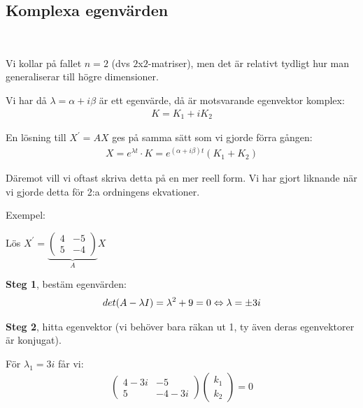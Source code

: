 \subsection{Komplexa egenvärden}\hfill\\
\par\bigskip
\noindent Vi kollar på fallet $n=2$ (dvs $2$x$2$-matriser), men det är relativt tydligt hur man generaliserar till högre dimensioner.\par
\noindent Vi har då $\lambda = \alpha+i\beta$ är ett egenvärde, då är motsvarande egenvektor komplex:
\begin{equation*}
  \begin{gathered}
    K = K_1+iK_2
  \end{gathered}
\end{equation*}\par
\noindent En lösning till $X^{\prime} = AX$ ges på samma sätt som vi gjorde förra gången:
\begin{equation*}
  \begin{gathered}
    X = e^{\lambda t}\cdot K = e^{(\alpha+i\beta)t}\left(K_1+K_2\right)
  \end{gathered}
\end{equation*}\par
\noindent Däremot vill vi oftast skriva detta på en mer reell form. Vi har gjort liknande när vi gjorde detta för 2:a ordningens ekvationer.
\par\bigskip
\noindent Exempel:\par
\noindent Lös $X^{\prime} = \underbrace{\begin{pmatrix}4&-5\\5&-4\end{pmatrix}}_{\text{$A$}}X$\par\bigskip
\noindent \textbf{Steg 1}, bestäm egenvärden:
\begin{equation*}
  \begin{gathered}
    det(A-\lambda I) = \lambda^2+9 = 0 \Leftrightarrow \lambda=\pm3i
  \end{gathered}
\end{equation*}
\par\bigskip
\noindent\textbf{Steg 2}, hitta egenvektor (vi behöver bara räkan ut 1, ty även deras egenvektorer är konjugat).\par
\noindent För $\lambda_1=3i$ får vi:
\begin{equation*}
  \begin{gathered}
    \begin{pmatrix}4-3i&-5\\5&-4-3i\end{pmatrix}\begin{pmatrix}k_1\\k_2\end{pmatrix}=0
  \end{gathered}
\end{equation*}\par
